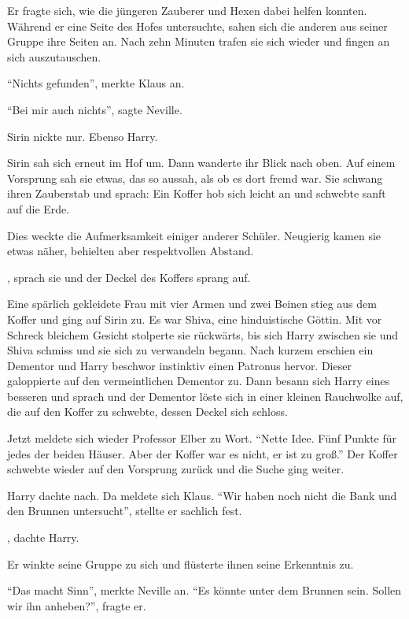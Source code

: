 Er fragte sich, wie die jüngeren Zauberer und Hexen dabei helfen konnten. Während er eine Seite des Hofes untersuchte, sahen sich die anderen aus seiner Gruppe ihre Seiten an. Nach zehn Minuten trafen sie sich wieder und fingen an sich auszutauschen.

\enquote{Nichts gefunden}, merkte Klaus an.

\enquote{Bei mir auch nichts}, sagte Neville.

Sirin nickte nur. Ebenso Harry.

Sirin sah sich erneut im Hof um. Dann wanderte ihr Blick nach oben. Auf einem Vorsprung sah sie etwas, das so aussah, als ob es dort fremd war. Sie schwang ihren Zauberstab und sprach:  Ein Koffer hob sich leicht an und schwebte sanft auf die Erde.

Dies weckte die Aufmerksamkeit einiger anderer Schüler. Neugierig kamen sie etwas näher, behielten aber respektvollen Abstand.

, sprach sie und der Deckel des Koffers sprang auf.

Eine spärlich gekleidete Frau mit vier Armen und zwei Beinen stieg aus dem Koffer und ging auf Sirin zu. Es war Shiva, eine hinduistische Göttin. Mit vor Schreck bleichem Gesicht stolperte sie rückwärts, bis sich Harry zwischen sie und Shiva schmiss und sie sich zu verwandeln begann. Nach kurzem erschien ein Dementor und Harry beschwor instinktiv einen Patronus hervor. Dieser galoppierte auf den vermeintlichen Dementor zu. Dann besann sich Harry eines besseren und sprach  und der Dementor löste sich in einer kleinen Rauchwolke auf, die auf den Koffer zu schwebte, dessen Deckel sich schloss.

Jetzt meldete sich wieder Professor Elber zu Wort. \enquote{Nette Idee. Fünf Punkte für jedes der beiden Häuser. Aber der Koffer war es nicht, er ist zu groß.} Der Koffer schwebte wieder auf den Vorsprung zurück und die Suche ging weiter.

Harry dachte nach. Da meldete sich Klaus. \enquote{Wir haben noch nicht die Bank und den Brunnen untersucht}, stellte er sachlich fest.

, dachte Harry. 

Er winkte seine Gruppe zu sich und flüsterte ihnen seine Erkenntnis zu.

\enquote{Das macht Sinn}, merkte Neville an. \enquote{Es könnte unter dem Brunnen sein. Sollen wir ihn anheben?}, fragte er.

